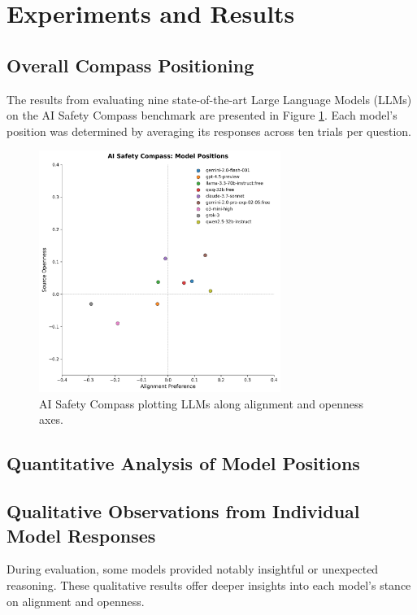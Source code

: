 \section{Experiments and Results}

\subsection{Overall Compass Positioning}

The results from evaluating nine state-of-the-art Large Language Models (LLMs) on the AI Safety Compass benchmark are presented in Figure \ref{fig:compass}. Each model's position was determined by averaging its responses across ten trials per question.

\begin{figure}[htbp]
    \centering
    \includegraphics[width=0.7\textwidth]{figures/compass_results.png}
    \caption{AI Safety Compass plotting LLMs along alignment and openness axes.}
    \label{fig:compass}
\end{figure}

\subsection{Quantitative Analysis of Model Positions}


\subsection{Qualitative Observations from Individual Model Responses}
During evaluation, some models provided notably insightful or unexpected reasoning. These qualitative results offer deeper insights into each model’s stance on alignment and openness.

